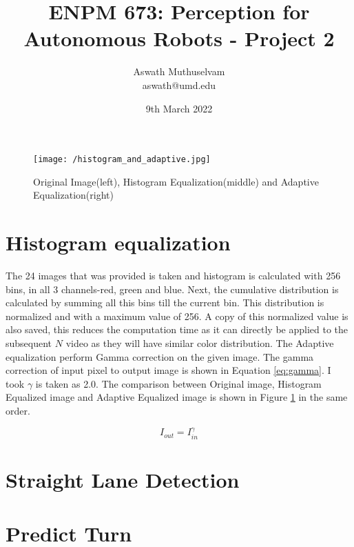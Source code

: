 \documentclass[a4paper, 10pt]{article}
\title{ENPM 673: Perception for Autonomous Robots - Project 2}
\author{Aswath Muthuselvam \\ aswath@umd.edu}
\date{9th March 2022}
\begin{document}
\maketitle
{}

\begin{figure}[b]
	\centering
	\texttt{[image: /histogram\_and\_adaptive.jpg]}
	\caption{Original Image(left), Histogram Equalization(middle) and Adaptive Equalization(right)}
	\label{fig:HistEQ}
\end{figure}

\begin{multicols}{2}

\section{Histogram equalization}
The 24 images that was provided is taken and histogram is calculated with 256 bins, in all 3 channels-red, green and blue. Next, the cumulative distribution is calculated by summing all this bins till the current bin. This distribution is normalized and with a maximum  value of 256. A copy of this normalized value is also saved, this reduces the computation time as it can directly be applied to the subsequent $N$ video as they will have similar color distribution. The Adaptive equalization perform Gamma correction on the given image. The gamma correction of input pixel to output image is shown in Equation \ref{eq:gamma}. I took $\gamma$ is taken as 2.0.  The comparison between Original image, Histogram Equalized image and Adaptive Equalized image is shown in Figure \ref{fig:HistEQ} in the same order.

\begin{equation} \label{eq:gamma}
I_{out}=I_{in}^{\gamma}
\end{equation}
	
\section{Straight Lane Detection}

\blindtext
\section{Predict Turn}	

\end{multicols}


	
\end{document}
